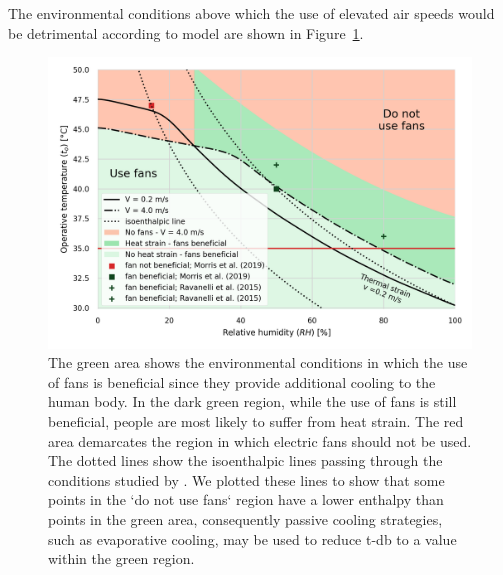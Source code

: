 The environmental conditions above which the use of elevated air speeds would be detrimental according to  model are shown in Figure~\ref{fig:use_fans_experimental}.

\begin{figure}[hbt!]
    \centering
    \includegraphics[width=\textwidth]{figures/summary_use_fans_comparison_experimental}
    \caption{The green area shows the environmental conditions in which the use of fans is beneficial since they provide additional cooling to the human body.
    In the dark green region, while the use of fans is still beneficial, people are most likely to suffer from heat strain.
    The red area demarcates the region in which electric fans should not be used.
    The dotted lines show the isoenthalpic lines passing through the conditions studied by .
    We plotted these lines to show that some points in the `do not use fans` region have a lower enthalpy than points in the green area, consequently passive cooling strategies, such as evaporative cooling, may be used to reduce \ac{t-db} to a value within the green region.
    }
    \label{fig:use_fans_experimental}
\end{figure}

